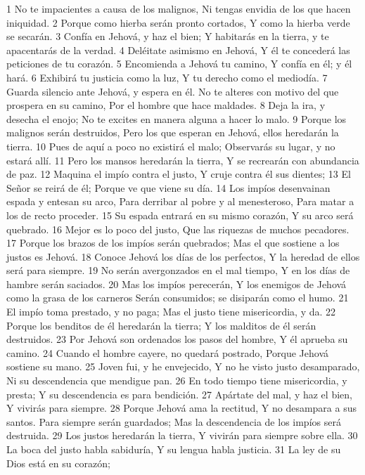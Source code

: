 1 No te impacientes a causa de los malignos,
Ni tengas envidia de los que hacen iniquidad.
2 Porque como hierba serán pronto cortados,
Y como la hierba verde se secarán.
3 Confía en Jehová, y haz el bien;
Y habitarás en la tierra, y te apacentarás de la verdad.
4 Deléitate asimismo en Jehová,
Y él te concederá las peticiones de tu corazón.
5 Encomienda a Jehová tu camino,
Y confía en él; y él hará.
6 Exhibirá tu justicia como la luz,
Y tu derecho como el mediodía.
7 Guarda silencio ante Jehová, y espera en él.
No te alteres con motivo del que prospera en su camino,
Por el hombre que hace maldades.
8 Deja la ira, y desecha el enojo;
No te excites en manera alguna a hacer lo malo.
9 Porque los malignos serán destruidos,
Pero los que esperan en Jehová, ellos heredarán la tierra.
10 Pues de aquí a poco no existirá el malo;
Observarás su lugar, y no estará allí.
11 Pero los mansos heredarán la tierra,
Y se recrearán con abundancia de paz.
12 Maquina el impío contra el justo,
Y cruje contra él sus dientes;
13 El Señor se reirá de él;
Porque ve que viene su día.
14 Los impíos desenvainan espada y entesan su arco,
Para derribar al pobre y al menesteroso,
Para matar a los de recto proceder.
15 Su espada entrará en su mismo corazón,
Y su arco será quebrado.
16 Mejor es lo poco del justo,
Que las riquezas de muchos pecadores.
17 Porque los brazos de los impíos serán quebrados;
Mas el que sostiene a los justos es Jehová.
18 Conoce Jehová los días de los perfectos,
Y la heredad de ellos será para siempre.
19 No serán avergonzados en el mal tiempo,
Y en los días de hambre serán saciados.
20 Mas los impíos perecerán,
Y los enemigos de Jehová como la grasa de los carneros
Serán consumidos; se disiparán como el humo.
21 El impío toma prestado, y no paga;
Mas el justo tiene misericordia, y da.
22 Porque los benditos de él heredarán la tierra;
Y los malditos de él serán destruidos.
23 Por Jehová son ordenados los pasos del hombre,
Y él aprueba su camino.
24 Cuando el hombre cayere, no quedará postrado,
Porque Jehová sostiene su mano.
25 Joven fui, y he envejecido,
Y no he visto justo desamparado,
Ni su descendencia que mendigue pan.
26 En todo tiempo tiene misericordia, y presta;
Y su descendencia es para bendición.
27 Apártate del mal, y haz el bien,
Y vivirás para siempre.
28 Porque Jehová ama la rectitud,
Y no desampara a sus santos.
Para siempre serán guardados;
Mas la descendencia de los impíos será destruida.
29 Los justos heredarán la tierra,
Y vivirán para siempre sobre ella.
30 La boca del justo habla sabiduría,
Y su lengua habla justicia.
31 La ley de su Dios está en su corazón;
